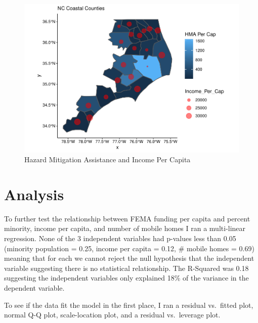 \documentclass[
  12pt,
]{article}
\begin{document}
\begin{figure}
\centering
\includegraphics{Alexander_ENV872_Project_files/figure-latex/map3-1.pdf}
\caption{Hazard Mitigation Assistance and Income Per Capita}
\end{figure}

\newpage

\hypertarget{analysis}{%
\section{Analysis}\label{analysis}}

To further test the relationship between FEMA funding per capita and
percent minority, income per capita, and number of mobile homes I ran a
multi-linear regression. None of the 3 independent variables had
p-values less than 0.05 (minority population = 0.25, income per capita =
0.12, \# mobile homes = 0.69) meaning that for each we cannot reject the
null hypothesis that the independent variable suggesting there is no
statistical relationship. The R-Squared was 0.18 suggesting the
independent variables only explained 18\% of the variance in the
dependent variable.

To see if the data fit the model in the first place, I ran a residual
vs.~fitted plot, normal Q-Q plot, scale-location plot, and a residual
vs.~leverage plot.
\end{document}
